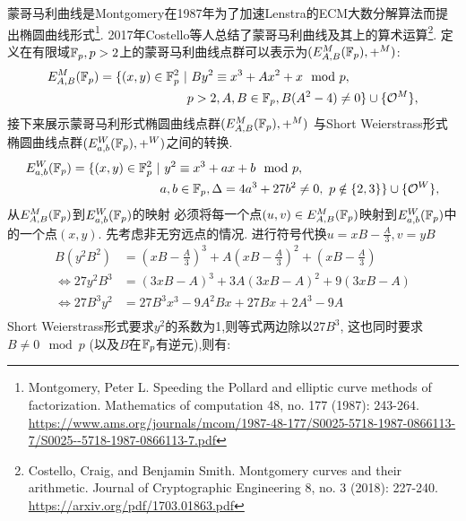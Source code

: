 蒙哥马利曲线是Montgomery在1987年为了加速Lenstra的ECM大数分解算法而提出椭圆曲线形式\footnote{
Montgomery, Peter L. Speeding the Pollard and elliptic curve methods of factorization.
Mathematics of computation 48, no. 177 (1987): 243-264. 
\url{https://www.ams.org/journals/mcom/1987-48-177/S0025-5718-1987-0866113-7/S0025--5718-1987-0866113-7.pdf}}.
2017年Costello等人总结了蒙哥马利曲线及其上的算术运算\footnote{
Costello, Craig, and Benjamin Smith. 
Montgomery curves and their arithmetic. 
Journal of Cryptographic Engineering 8, no. 3 (2018): 227-240.
\url{https://arxiv.org/pdf/1703.01863.pdf}}.
定义在有限域$\mathbb{F}_p, p>2$上的蒙哥马利曲线点群可以表示为$(E_{A,B}^M(\mathbb{F}_p), +^M)$:
\begin{equation*}
\begin{split}
E_{A,B}^M(\mathbb{F}_p) = \{(x,y)\in\mathbb{F}_p^2\  | &\  B y^2 \equiv x^3 + A x^2 + x\mod p, \\
& p >2, A, B \in \mathbb{F}_p, B(A^2-4)\neq 0 \} \cup \{\mathcal{O}^M\},
\end{split}
\end{equation*}
接下来展示蒙哥马利形式椭圆曲线点群$(E_{A,B}^M(\mathbb{F}_p), +^M)$
与Short Weierstrass形式椭圆曲线点群$(E_{a,b}^{W}(\mathbb{F}_p), +^W)$之间的转换.
\begin{equation*}
\begin{split}
E_{a,b}^{W}(\mathbb{F}_p)= \{(x,y)\in \mathbb{F}_p^2\ | & \ y^2 \equiv x^3 + ax + b \mod p, \\
 & a, b \in \mathbb{F}_p, \Delta = 4a^3 + 27b^2 \neq 0, \ p \notin \{2,3\}\} \cup \{\mathcal{O}^W\},
\end{split}
\end{equation*}
从$E_{A,B}^M(\mathbb{F}_p)$到$E_{a,b}^{W}(\mathbb{F}_p)$的映射
必须将每一个点$(u,v)\in E_{A,B}^M(\mathbb{F}_p)$映射到$E_{a,b}^{W}(\mathbb{F}_p)$中的一个点$(x,y)$.
先考虑非无穷远点的情况.
进行符号代换$u = xB - \frac{A}{3}, v = yB$
\begin{equation*}
\begin{split}
B\left(y^2B^2\right) & = \left( xB - \frac{A}{3} \right)^3 + 
A \left( xB - \frac{A}{3} \right)^2 +  \left(xB - \frac{A}{3}\right) \\
\iff 
27 y^2 B^3 & = (3xB - A)^3 + 3A(3xB-A)^2 + 9(3xB - A) \\
\iff 
27 B^3 y^2 & = 27B^3x^3 - 9A^2Bx + 27Bx + 2A^3 - 9A \\
\end{split}
\end{equation*}
Short Weierstrass形式要求$y^2$的系数为1,则等式两边除以$27B^3$,
这也同时要求$B\neq 0\mod p$ (以及$B$在$\mathbb{F}_p$有逆元),则有:
